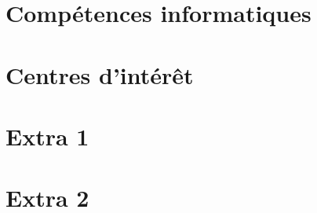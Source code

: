 \documentclass[11pt,a4paper,sans,french]{moderncv}        %
\begin{document}
\section{Compétences informatiques}
\cvdoubleitem{}{}{}{}%
\cvdoubleitem{}{}{}{}%
\cvdoubleitem{}{}{}{}%
\section{Centres d'intérêt}
\cvitem{}{}%
\cvitem{}{}%
\cvitem{}{}%
\section{Extra 1}
\cvlistitem{}%
\cvlistitem{}%
\cvlistitem{}%
\section{Extra 2}
\cvlistdoubleitem{}{}%
\cvlistdoubleitem{}{}%
\cvlistdoubleitem{}{}%
\end{document}
